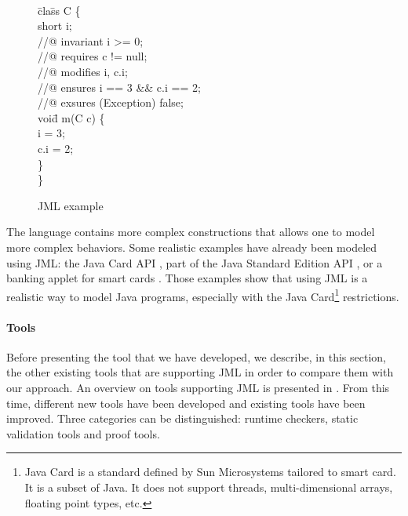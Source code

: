 \begin{figure}[htp]
{\tt
\begin{tabbing}
 \hspace{3 cm} \=cla\=ss  C \{ \\
 \> \> short i; \\
 \> \> //@ invariant i >= 0;\\[2 mm]
 \> \> //@ requires c != null;\\
 \> \> //@ modifies i, c.i; \\
 \> \> //@ ensures i == 3 \&\& c.i == 2; \\
 \> \> //@ exsures (Exception) false; \\
 \> \> voi\=d m(C c) \{\\
 \> \> \> i = 3;\\
 \> \> \> c.i = 2;\\
 \> \> \} \\
 \> \}
\end{tabbing}
}
 \caption{JML example}
\label{JMLexample}
\end{figure}

The language contains more complex constructions that allows one to model more complex behaviors.  Some
realistic examples have already been modeled using JML: the Java Card API \cite{PVBJ00a}, part of the Java
Standard Edition API \cite{HJVB00}, or a banking applet for smart cards \cite{Catano37:FME:2002}.  Those
examples show that using JML is a realistic way to model Java programs, especially with the Java
Card\footnote{Java Card is a standard defined by Sun Microsystems tailored to smart card. It is a subset of
Java.  It does not support threads, multi-dimensional arrays, floating point types, etc.} restrictions.
\paragraph{Tools}
 Before presenting the tool that we have developed, we describe, in
 this section, the other existing tools that are
supporting JML in order to compare them with our approach.
 An overview on tools supporting JML is presented in
 \cite{Leavens-etal00}.  From this time, different new tools have been
 developed and existing tools have been improved.  Three categories
 can be distinguished: runtime checkers, static validation tools and
 proof tools.
